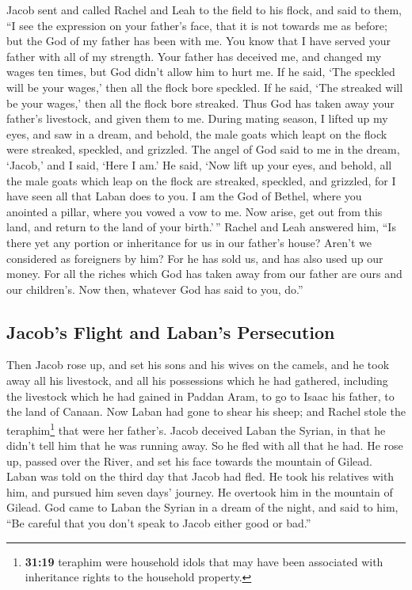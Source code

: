  Jacob sent and called Rachel and Leah to the field to his
flock,  and said to them, ``I see the expression on your
father's face, that it is not towards me as before; but the God of my
father has been with me.  You know that I have served your
father with all of my strength.  Your father has deceived
me, and changed my wages ten times, but God didn't allow him to hurt me.
 If he said, `The speckled will be your wages,' then all
the flock bore speckled. If he said, `The streaked will be your wages,'
then all the flock bore streaked.  Thus God has taken away
your father's livestock, and given them to me.  During
mating season, I lifted up my eyes, and saw in a dream, and behold, the
male goats which leapt on the flock were streaked, speckled, and
grizzled.  The angel of God said to me in the dream,
`Jacob,' and I said, `Here I am.'  He said, `Now lift up
your eyes, and behold, all the male goats which leap on the flock are
streaked, speckled, and grizzled, for I have seen all that Laban does to
you.  I am the God of Bethel, where you anointed a
pillar, where you vowed a vow to me. Now arise, get out from this land,
and return to the land of your birth.'\,''  Rachel and
Leah answered him, ``Is there yet any portion or inheritance for us in
our father's house?  Aren't we considered as foreigners
by him? For he has sold us, and has also used up our money.
 For all the riches which God has taken away from our
father are ours and our children's. Now then, whatever God has said to
you, do.''

\hypertarget{jacobs-flight-and-labans-persecution}{%
\subsection{Jacob's Flight and Laban's
Persecution}\label{jacobs-flight-and-labans-persecution}}

 Then Jacob rose up, and set his sons and his wives on
the camels,  and he took away all his livestock, and all
his possessions which he had gathered, including the livestock which he
had gained in Paddan Aram, to go to Isaac his father, to the land of
Canaan.  Now Laban had gone to shear his sheep; and
Rachel stole the teraphim\footnote{\textbf{31:19} teraphim were
  household idols that may have been associated with inheritance rights
  to the household property.} that were her father's. 
Jacob deceived Laban the Syrian, in that he didn't tell him that he was
running away.  So he fled with all that he had. He rose
up, passed over the River, and set his face towards the mountain of
Gilead.  Laban was told on the third day that Jacob had
fled.  He took his relatives with him, and pursued him
seven days' journey. He overtook him in the mountain of Gilead.
 God came to Laban the Syrian in a dream of the night,
and said to him, ``Be careful that you don't speak to Jacob either good
or bad.''

